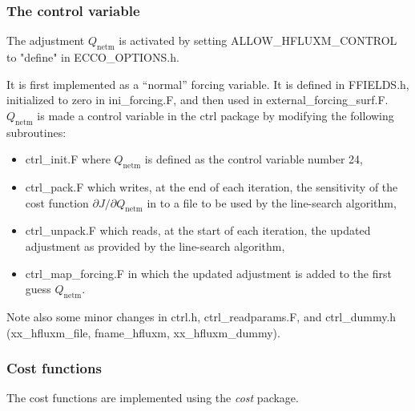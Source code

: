 \subsubsection{The control variable}

The adjustment $Q_\mathrm{netm}$ is activated by setting
ALLOW\_HFLUXM\_CONTROL to "define" in ECCO\_OPTIONS.h.

It is first implemented as a ``normal'' forcing variable. It is defined in
FFIELDS.h, initialized to zero in ini\_forcing.F, and then used in
external\_forcing\_surf.F. $Q_\mathrm{netm}$ is made a control variable in
the ctrl package by modifying the following subroutines:

\begin{itemize}
\item ctrl\_init.F where $Q_\mathrm{netm}$ is defined as the control variable
number 24,

\item ctrl\_pack.F which writes, at the end of each iteration, the sensitivity
of the cost function $\partial J/\partial Q_\mathrm{netm}$ in to a file to be
used by the line-search algorithm,

\item ctrl\_unpack.F which reads, at the start of each iteration, the updated
adjustment as provided by the line-search algorithm,

\item ctrl\_map\_forcing.F in which the updated adjustment is added to the
first guess $Q_\mathrm{netm}$.
\end{itemize}

Note also some minor changes in ctrl.h, ctrl\_readparams.F, and ctrl\_dummy.h
(xx\_hfluxm\_file, fname\_hfluxm, xx\_hfluxm\_dummy).

\subsubsection{Cost functions}

The cost functions are implemented using the {\it cost} package.

